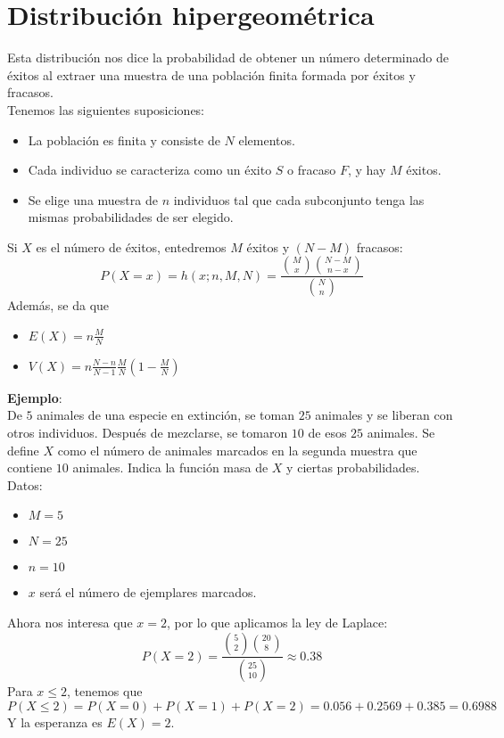 \documentclass{./Probabilidad.tex}
\begin{document}
\section{Distribución hipergeométrica}
Esta distribución nos dice la probabilidad de obtener un número determinado de éxitos al extraer una muestra de una población finita formada por éxitos y fracasos.\\
Tenemos las siguientes suposiciones:
\begin{itemize}
	\item La población es finita y consiste de $N$ elementos.
	\item Cada individuo se caracteriza como un éxito $S$ o fracaso $F$, y hay $M$ éxitos.
	\item Se elige una muestra de $n$ individuos tal que cada subconjunto tenga las mismas probabilidades de ser elegido. 
\end{itemize}
Si $X$ es el número de éxitos, entedremos $M$ éxitos y $(N-M)$ fracasos:
\[
	P(X=x)=h(x;n,M,N) = \frac{\binom{M}{x}\binom{N-M}{n-x}}{\binom{N}{n}}
\]
Además, se da que
\begin{itemize}
	\item $E(X)=n \frac{M}{N}$
	\item $V(X)=n \frac{N-n}{N-1} \frac{M}{N} (1 - \frac{M}{N})$ 
\end{itemize}
\textbf{Ejemplo}:\\
De $5$ animales de una especie en extinción, se toman $25$ animales y se liberan con otros individuos. Después de mezclarse, se tomaron $10$ de esos $25$ animales. Se define $X$ como el número de animales marcados en la segunda muestra que contiene $10$ animales. Indica la función masa de $X$ y ciertas probabilidades.\\
Datos:
\begin{itemize}
	\item $M=5$
	\item $N=25$
	\item $n=10$
	\item $x$ será el número de ejemplares marcados. 
\end{itemize}
Ahora nos interesa que $x=2$, por lo que aplicamos la ley de Laplace:
\[
	P(X=2)= \frac{\binom{5}{2}\binom{20}{8}}{\binom{25}{10}}\approx 0.38
\]
Para $x\leq 2$, tenemos que
\[
	P(X\leq 2) = P(X=0) + P(X=1)+P(X=2)=0.056+0.2569+0.385=0.6988
\]
Y la esperanza es $E(X)=2$.
\end{document}
